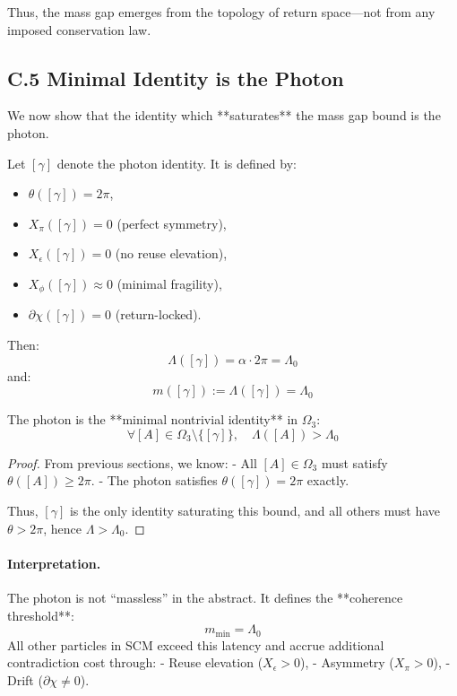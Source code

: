Thus, the mass gap emerges from the topology of return space—not from any imposed conservation law.

\subsection*{C.5 \quad Minimal Identity is the Photon}
\label{sec:c5-photon-minimal}

We now show that the identity which **saturates** the mass gap bound is the photon.

\begin{definition}
Let $[\gamma]$ denote the photon identity. It is defined by:
\begin{itemize}
    \item $\theta([\gamma]) = 2\pi$,
    \item $X_\pi([\gamma]) = 0$ (perfect symmetry),
    \item $X_\epsilon([\gamma]) = 0$ (no reuse elevation),
    \item $X_\phi([\gamma]) \approx 0$ (minimal fragility),
    \item $\partial\chi([\gamma]) = 0$ (return-locked).
\end{itemize}
Then:
\[
\Lambda([\gamma]) = \alpha \cdot 2\pi = \Lambda_0
\]
and:
\[
m([\gamma]) := \Lambda([\gamma]) = \Lambda_0
\]
\end{definition}

\begin{proposition}
The photon is the **minimal nontrivial identity** in $\Omega_3$:
\[
\forall [A] \in \Omega_3 \setminus \{[\gamma]\}, \quad \Lambda([A]) > \Lambda_0
\]
\end{proposition}

\begin{proof}
From previous sections, we know:
- All $[A] \in \Omega_3$ must satisfy $\theta([A]) \geq 2\pi$.
- The photon satisfies $\theta([\gamma]) = 2\pi$ exactly.

Thus, $[\gamma]$ is the only identity saturating this bound, and all others must have $\theta > 2\pi$, hence $\Lambda > \Lambda_0$.

\end{proof}

\paragraph{Interpretation.}
The photon is not “massless” in the abstract. It defines the **coherence threshold**:
\[
m_{\text{min}} = \Lambda_0
\]
All other particles in SCM exceed this latency and accrue additional contradiction cost through:
- Reuse elevation ($X_\epsilon > 0$),
- Asymmetry ($X_\pi > 0$),
- Drift ($\partial \chi \ne 0$).

